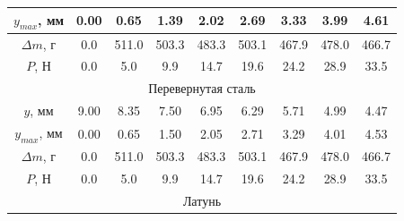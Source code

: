 \documentclass[12pt]{article}
\begin{document}
\begin{enumerate}
\begin{table}[H]
\begin{tabular}{|ccccccccc|}
            \multicolumn{1}{|c|}{$y_{max}$, мм} & \multicolumn{1}{c|}{0.00} & \multicolumn{1}{c|}{0.65}  & \multicolumn{1}{c|}{1.39}  & \multicolumn{1}{c|}{2.02}  & \multicolumn{1}{c|}{2.69}  & \multicolumn{1}{c|}{3.33}  & \multicolumn{1}{c|}{3.99}  & 4.61  \\ \hline
            \multicolumn{1}{|c|}{$\Delta m$, г} & \multicolumn{1}{c|}{0.0}  & \multicolumn{1}{c|}{511.0} & \multicolumn{1}{c|}{503.3} & \multicolumn{1}{c|}{483.3} & \multicolumn{1}{c|}{503.1} & \multicolumn{1}{c|}{467.9} & \multicolumn{1}{c|}{478.0} & 466.7 \\ \hline
            \multicolumn{1}{|c|}{$P$, Н}        & \multicolumn{1}{c|}{0.0}  & \multicolumn{1}{c|}{5.0}   & \multicolumn{1}{c|}{9.9}   & \multicolumn{1}{c|}{14.7}  & \multicolumn{1}{c|}{19.6}  & \multicolumn{1}{c|}{24.2}  & \multicolumn{1}{c|}{28.9}  & 33.5  \\ \hline
            \multicolumn{9}{|c|}{Перевернутая сталь}                                                                                                                                                                                                              \\ \hline
            \multicolumn{1}{|c|}{$y$, мм}       & \multicolumn{1}{c|}{9.00} & \multicolumn{1}{c|}{8.35}  & \multicolumn{1}{c|}{7.50}  & \multicolumn{1}{c|}{6.95}  & \multicolumn{1}{c|}{6.29}  & \multicolumn{1}{c|}{5.71}  & \multicolumn{1}{c|}{4.99}  & 4.47  \\ \hline
            \multicolumn{1}{|c|}{$y_{max}$, мм} & \multicolumn{1}{c|}{0.00} & \multicolumn{1}{c|}{0.65}  & \multicolumn{1}{c|}{1.50}  & \multicolumn{1}{c|}{2.05}  & \multicolumn{1}{c|}{2.71}  & \multicolumn{1}{c|}{3.29}  & \multicolumn{1}{c|}{4.01}  & 4.53  \\ \hline
            \multicolumn{1}{|c|}{$\Delta m$, г} & \multicolumn{1}{c|}{0.0}  & \multicolumn{1}{c|}{511.0} & \multicolumn{1}{c|}{503.3} & \multicolumn{1}{c|}{483.3} & \multicolumn{1}{c|}{503.1} & \multicolumn{1}{c|}{467.9} & \multicolumn{1}{c|}{478.0} & 466.7 \\ \hline
            \multicolumn{1}{|c|}{$P$, Н}        & \multicolumn{1}{c|}{0.0}  & \multicolumn{1}{c|}{5.0}   & \multicolumn{1}{c|}{9.9}   & \multicolumn{1}{c|}{14.7}  & \multicolumn{1}{c|}{19.6}  & \multicolumn{1}{c|}{24.2}  & \multicolumn{1}{c|}{28.9}  & 33.5  \\ \hline
            \multicolumn{9}{|c|}{Латунь}                                                                                                                                                                                                                          \\ \hline

\end{tabular}
\end{table}
\end{enumerate}
\end{document}
